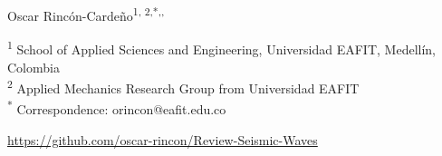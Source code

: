 \documentclass[11pt,twoside]{article}
\begin{document}
{\begin{center}
Oscar Rincón-Cardeño\textsuperscript{1, 2,*,\href{https://orcid.org/0000-0002-5308-9710}{\aiOrcid},
\href{https://github.com/oscar-rincon}{\faGithubSquare}}
\end{center}
}

\vspace{-0.3cm}

{\footnotesize
\noindent\textsuperscript{1} School of Applied Sciences and Engineering, Universidad EAFIT, 
Medellín, Colombia\\
\noindent\textsuperscript{2} Applied Mechanics Research Group from Universidad EAFIT\\
\noindent\textsuperscript{*} Correspondence: orincon@eafit.edu.co
}


{\noindent\footnotesize{\href{https://github.com/oscar-rincon/Review-Seismic-Waves}
{\faGithubSquare \href{https://github.com/oscar-rincon/Review-Seismic-Waves}{ https://github.com/oscar-rincon/Review-Seismic-Waves}}
}
}

\vspace{2mm}

\end{document}
